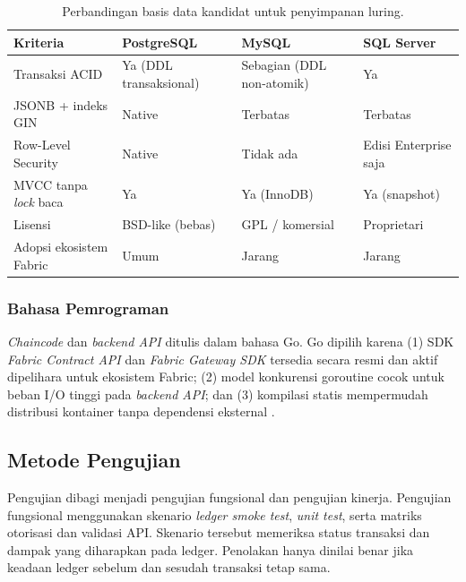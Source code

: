 \begin{table}[H]
    \caption{Perbandingan basis data kandidat untuk penyimpanan luring.}
    \vspace{0.5em}
    \centering
    \small
    \begin{tabular}{@{}p{}p{}p{}p{}@{}}
        \toprule
        \textbf{Kriteria} & \textbf{PostgreSQL} & \textbf{MySQL} & \textbf{SQL Server} \\
        \midrule
        Transaksi ACID & Ya (DDL transaksional) & Sebagian (DDL non-atomik) & Ya \\
        \addlinespace
        JSONB + indeks GIN & Native & Terbatas & Terbatas \\
        \addlinespace
        Row-Level Security & Native & Tidak ada & Edisi Enterprise saja \\
        \addlinespace
        MVCC tanpa \textit{lock} baca & Ya & Ya (InnoDB) & Ya (snapshot) \\
        \addlinespace
        Lisensi & BSD-like (bebas) & GPL / komersial & Proprietari \\
        \addlinespace
        Adopsi ekosistem Fabric & Umum & Jarang & Jarang \\
        \bottomrule
    \end{tabular}
    \label{tab:ch3-db-comparison}
\end{table}

\subsubsection{Bahasa Pemrograman}

\textit{Chaincode} dan \textit{backend API} ditulis dalam bahasa Go. Go dipilih
karena (1) SDK \textit{Fabric Contract API} dan \textit{Fabric Gateway SDK}
tersedia secara resmi dan aktif dipelihara untuk ekosistem Fabric; (2) model
konkurensi goroutine cocok untuk beban I/O tinggi pada \textit{backend API};
dan (3) kompilasi statis mempermudah distribusi kontainer tanpa dependensi
eksternal \cite{androulaki2018}.

\subsection{Metode Pengujian}

Pengujian dibagi menjadi pengujian fungsional dan pengujian kinerja. Pengujian
fungsional menggunakan skenario \textit{ledger smoke test}, \textit{unit test},
serta matriks otorisasi dan validasi API. Skenario tersebut memeriksa status
transaksi dan dampak yang diharapkan pada ledger. Penolakan hanya dinilai benar
jika keadaan ledger sebelum dan sesudah transaksi tetap sama.

